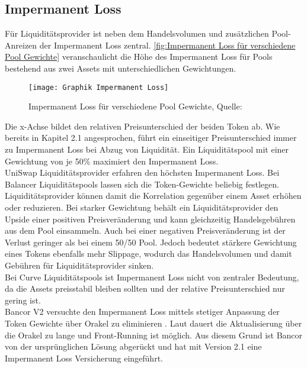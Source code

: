 \documentclass[12pt,a4paper,titlepage,oneside,english]{article}
\begin{document}
\subsection{Impermanent Loss}
Für Liquiditätsprovider ist neben dem Handelsvolumen und zusätzlichen Pool-Anreizen %
der Impermanent Loss zentral.
\autoref{fig:Impermanent Loss für verschiedene Pool Gewichte} veranschaulicht die Höhe des Impermanent Loss für Pools bestehend aus zwei Assets mit unterschiedlichen Gewichtungen.
	\begin{figure}[h!]
	\begin{center}
	\texttt{[image: Graphik Impermanent Loss]}
	\caption{Impermanent Loss für verschiedene Pool Gewichte, Quelle: \citet{Martinelli8020}}\label{fig:Impermanent Loss für verschiedene Pool Gewichte}
	\end{center}
	\end{figure}
\newpage
Die x-Achse bildet den relativen Preisunterschied der beiden Token ab. Wie bereits in Kapitel 2.1 angesprochen, führt ein einseitiger Preisunterschied immer zu Impermanent Loss bei Abzug von Liquidität. Ein Liquiditätspool mit einer Gewichtung von je 50\% maximiert den Impermanent Loss. \citep{Martinelli8020}\\
UniSwap Liquiditätsprovider erfahren den höchsten Impermanent Loss.
Bei Balancer Liquiditätspools lassen sich die Token-Gewichte beliebig festlegen. Liquiditätsprovider können damit die Korrelation gegenüber einem Asset erhöhen oder reduzieren.  Bei starker Gewichtung behält ein Liquiditätsprovider den Upside einer positiven Preisveränderung und kann gleichzeitig Handelsgebühren aus dem Pool einsammeln. Auch bei einer negativen Preisveränderung ist der Verlust geringer als bei einem 50/50 Pool.  
Jedoch bedeutet stärkere Gewichtung eines Tokens ebenfalls mehr Slippage, wodurch das Handelsvolumen und damit Gebühren für Liquiditätsprovider sinken. \citep{Martinelli8020} \\
Bei Curve Liquiditätspools ist Impermanent Loss nicht von zentraler Bedeutung, da die Assets preisstabil bleiben sollten und der relative Preisunterschied nur gering ist. \\ Bancor V2 versuchte den Impermanent Loss mittels stetiger Anpassung der Token Gewichte über Orakel zu eliminieren \citep{Chainlink2020}. Laut \citet{Shevchenko2020} dauert die Aktualisierung über die Orakel zu lange und Front-Running ist möglich. Aus diesem Grund ist Bancor von der ursprünglichen Lösung abgerückt und hat mit Version 2.1 eine Impermanent Loss Versicherung eingeführt. \citep{Shevchenko2020}
\end{document}
